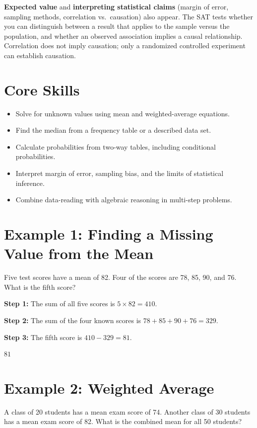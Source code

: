 \documentclass[14pt]{extarticle}
\begin{document}
\textbf{Expected value} and \textbf{interpreting statistical claims} (margin of error, sampling methods, correlation vs.\ causation) also appear. The SAT tests whether you can distinguish between a result that applies to the sample versus the population, and whether an observed association implies a causal relationship. Correlation does not imply causation; only a randomized controlled experiment can establish causation.

\section*{Core Skills}
\begin{itemize}
  \item Solve for unknown values using mean and weighted-average equations.
  \item Find the median from a frequency table or a described data set.
  \item Calculate probabilities from two-way tables, including conditional probabilities.
  \item Interpret margin of error, sampling bias, and the limits of statistical inference.
  \item Combine data-reading with algebraic reasoning in multi-step problems.
\end{itemize}

\section*{Example 1: Finding a Missing Value from the Mean}

Five test scores have a mean of 82. Four of the scores are 78, 85, 90, and 76. What is the fifth score?

\textbf{Step 1:} The sum of all five scores is \(5 \times 82 = 410\).

\textbf{Step 2:} The sum of the four known scores is \(78 + 85 + 90 + 76 = 329\).

\textbf{Step 3:} The fifth score is \(410 - 329 = 81\).

\(\boxed{81}\)

\section*{Example 2: Weighted Average}

A class of 20 students has a mean exam score of 74. Another class of 30 students has a mean exam score of 82. What is the combined mean for all 50 students?
\end{document}
